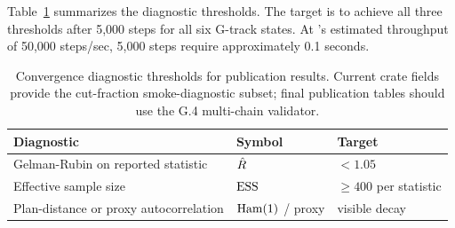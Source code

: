 Table~\ref{tab:diag-targets} summarizes the diagnostic thresholds.
The target is to achieve all three thresholds after 5{,}000 steps for
all six G-track states.
At \re{}'s estimated throughput of 50{,}000 steps/sec, 5{,}000 steps
require approximately 0.1 seconds.

\begin{table}[h]
\centering
\caption{Convergence diagnostic thresholds for \re{} publication results.
  Current crate fields provide the cut-fraction smoke-diagnostic subset;
  final publication tables should use the G.4 multi-chain validator.}
\label{tab:diag-targets}
\begin{tabular}{lll}
\toprule
Diagnostic & Symbol & Target \\
\midrule
Gelman-Rubin on reported statistic & $\hat{R}$ & $< 1.05$ \\
Effective sample size & $\mathrm{ESS}$ & $\geq 400$ per statistic \\
Plan-distance or proxy autocorrelation & $\mathrm{Ham}(1)$ / proxy & visible decay \\
\bottomrule
\end{tabular}
\end{table}
